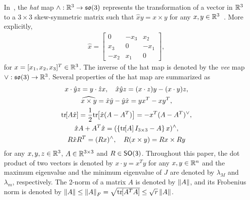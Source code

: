 \documentclass[letterpaper, 10 pt, conference]{ieeeconf}  %
\begin{document}
In~, the \textit{hat} map $\wedge :\mathbb{R}^{3}\rightarrow\mathfrak{so}(3)$ represents the transformation of a vector in $\mathbb{R}^{3}$ to a $3\times 3$ skew-symmetric matrix such that $\hat x y = x\times y$ for any $x,y\in\mathbb{R}^{3}$~\cite{bullo2004}. 
More explicitly, 
\begin{align*}
\hat x = \begin{bmatrix} 0 & -x_3 & x_2 \\ x_3 & 0 & -x_1 \\ -x_2 & x_1 & 0\end{bmatrix},
\end{align*}
for $x=[x_1,x_2,x_3]^T\in\mathbb{R}^{3}$. 
The inverse of the hat map is denoted by the \textit{vee} map $\vee:\mathfrak{so}(3)\rightarrow\mathbb{R}^{3}$. 
Several properties of the hat map are summarized as
\begin{gather}
    x\cdot \hat y z = y\cdot \hat z x,\quad \hat x\hat y z = (x\cdot z) y - (x\cdot y ) z\label{eqn:STP},\\
    \widehat{x\times y} = \hat x \hat y -\hat y \hat x = yx^T-xy^T,\label{eqn:hatxy}\\
    \mathrm{tr}\negthickspace\left[ A\hat x  \right]=\frac{1}{2}\mathrm{tr}\negthickspace\left[ \hat x (A-A^T) \right]=-x^T (A-A^T)^\vee,\label{eqn:hat1}\\
    \hat x  A+A^T\hat x=(\left\{ \mathrm{tr}\negthickspace\left[ A \right]I_{3\times 3}-A \right\}x)^{\wedge},\label{eqn:xAAx}\\
R\hat x R^T = (Rx)^\wedge,\quad 
R(x\times y) = Rx\times Ry\label{eqn:RxR}
\end{gather}
for any $x,y,z\in\mathbb{R}^{3}$, $A\in\mathbb{R}^{3\times 3}$ and $R\in\mathsf{SO(3)}$. 
Throughout this paper, the dot product of two vectors is denoted by $x\cdot y = x^T y$ for any $x,y\in\mathbb{R}^n$ and the maximum eigenvalue and the minimum eigenvalue of $J$ are denoted by $\lambda_M$ and $\lambda_m$, respectively. 
The 2-norm of a matrix \( A \) is denoted by \( \left\| A \right\| \), and its Frobenius norm is denoted by \( \left\| A \right\| \leq \left\| A \right\|_F = \sqrt{\mathrm{tr}\negthickspace\left[ A^T A \right]} \leq \sqrt{r} \left\| A \right\| \).
\end{document}
